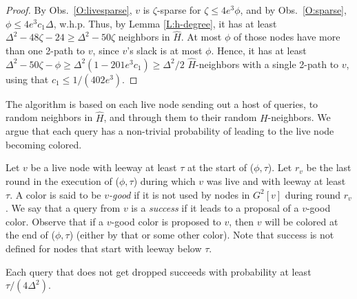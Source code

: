 \begin{proof}
By Obs.~\ref{O:livesparse}, $v$ is $\zeta$-sparse for $\zeta \le 4e^3 \phi$, and by Obs.~\ref{O:sparse}, $\phi \le 4 e^3 c_1 \Delta$, w.h.p.
Thus, by Lemma \ref{L:h-degree}, it has at least $\Delta^2 - 48\zeta - 24 \ge \Delta^2 - 50\zeta$ neighbors in $\hat{H}$. At most $\phi$ of those nodes have more than one 2-path to $v$, since $v$'s slack is at most $\phi$. Hence, it has at least $\Delta^2 - 50\zeta - \phi \ge \Delta^2(1 - 201 e^3 c_1) \ge \Delta^2/2$ $\hat{H}$-neighbors with a single 2-path to $v$, using that $c_1 \le 1/(402 e^3)$.
\end{proof}

The algorithm is based on each live node sending out a host of queries, to random neighbors in $\hat{H}$, and through them to their random $H$-neighbors. We argue that each query has a non-trivial probability of leading to the live node becoming colored.

Let $v$ be a live node with leeway at least $\tau$ at the start of ($\phi,\tau$). 
Let $r_v$ be the last round in the execution of ($\phi,\tau$) during which $v$ was live and with leeway at least $\tau$.
A color is said to be \emph{$v$-good} if it is not used by nodes in $G^2[v]$ during round $r_v$. We say that a query from $v$ is a \emph{success} if it leads to a proposal of a $v$-good color. Observe that if a $v$-good color is proposed to $v$, then $v$ will be colored at the end of ($\phi,\tau$) (either by that or some other color). 
Note that success is not defined for nodes that start with leeway below $\tau$.



%
\begin{lemma}
Each query that does not get dropped succeeds with probability at least $\tau/(4\Delta^2)$.
\label{L:progress}
\end{lemma}

